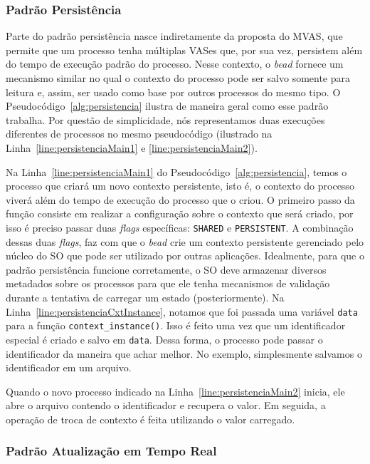\subsubsection{Padrão Persistência}

Parte do padrão persistência nasce indiretamente da proposta do MVAS, que
permite que um processo tenha múltiplas VASes que, por sua vez, persistem além do
tempo de execução padrão do processo. Nesse contexto, o \emph{bead} fornece um
mecanismo similar no qual o contexto do processo pode ser salvo somente
para leitura e, assim, ser usado como base por outros processos do mesmo tipo. O
Pseudocódigo~\ref{alg:persistencia} ilustra de maneira geral como esse
padrão trabalha. Por questão de simplicidade, nós representamos duas execuções
diferentes de processos no mesmo pseudocódigo (ilustrado na
Linha~\ref{line:persistenciaMain1} e \ref{line:persistenciaMain2}).



Na Linha~\ref{line:persistenciaMain1} do Pseudocódigo~\ref{alg:persistencia},
temos o processo que criará um novo contexto persistente, isto é, o contexto do
processo viverá além do tempo de execução do processo que o criou. O primeiro
passo da função consiste em realizar a configuração sobre o contexto que será
criado, por isso é preciso passar duas \emph{flags} específicas:
\texttt{SHARED} e \texttt{PERSISTENT}. A combinação dessas duas \emph{flags},
faz com que o \emph{bead} crie um contexto persistente gerenciado pelo núcleo
do SO que pode ser utilizado por outras aplicações. Idealmente, para que o
padrão persistência funcione corretamente, o SO deve armazenar diversos
metadados sobre os processos para que ele tenha mecanismos de validação durante
a tentativa de carregar um estado (posteriormente). Na
Linha~\ref{line:persistenciaCxtInstance}, notamos que foi passada uma variável
\texttt{data} para a função \texttt{context\_instance()}. Isso é feito uma vez
que um identificador especial é criado e salvo em \texttt{data}. Dessa forma, o
processo pode passar o identificador da maneira que achar melhor. No exemplo,
simplesmente salvamos o identificador em um arquivo.

Quando o novo processo indicado na Linha~\ref{line:persistenciaMain2} inicia,
ele abre o arquivo contendo o identificador e recupera o valor. Em seguida, a
operação de troca de contexto é feita utilizando o valor carregado.

\subsubsection{Padrão Atualização em Tempo Real}

